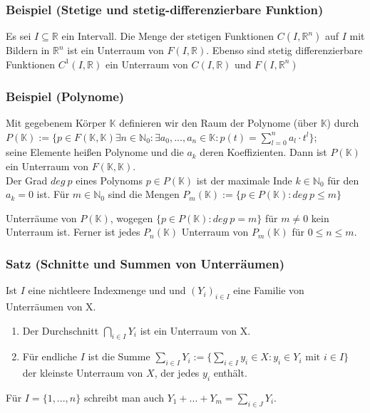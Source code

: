 \subsubsection{Beispiel (Stetige und stetig-differenzierbare Funktion)}
Es sei $I\subseteq \mathbb{R}$ ein Intervall. Die Menge der stetigen Funktionen $C(I,\mathbb{R}^n)$ auf $I$ mit Bildern in $\mathbb{R}^n$ ist ein Unterraum von $F(I,\mathbb{R})$. Ebenso sind stetig differenzierbare Funktionen $C^1(I,\mathbb{R})$ ein Unterraum von $C(I,\mathbb{R})$ und $F(I,\mathbb{R}^n)$
\subsubsection{Beispiel (Polynome)}
Mit gegebenem Körper $\mathbb{K}$ definieren wir den Raum der Polynome (über $\mathbb{K}$) durch \\$P(\mathbb{K}) := \{p\in F(\mathbb{K},\mathbb{K}) \exists n\in\mathbb{N}_0: \exists a_0, ..., a_n \in \mathbb{K} : p(t)=\sum^{n}_{l=0} a_l \cdot t^l\}$;\\
seine Elemente heißen Polynome und die $a_k$ deren Koeffizienten. Dann ist $P(\mathbb{K})$ ein Unterraum von $F(\mathbb{K},\mathbb{K})$.\\
Der Grad $deg\ p$ eines Polynoms $p\in P(\mathbb{K})$ ist der maximale Inde $k\in\mathbb{N}_0$ für den $a_k=0$ ist. Für $m\in\mathbb{N}_0$ sind die Mengen $P_m(\mathbb{K}) := \{p\in P(\mathbb{K}):deg\ p \le m\}$

Unterräume von $P(\mathbb{K})$, wogegen $\{p\in P(\mathbb{K}): deg\ p =m\}$ für $m\neq 0$ kein Unterraum ist. Ferner ist jedes $P_n(\mathbb{K})$ Unterraum von $P_m(\mathbb{K})$ für $0\le n\le m$.
\subsubsection{Satz (Schnitte und Summen von Unterräumen)}
Ist $I$ eine nichtleere Indexmenge und und $(Y_i)_{i\in I}$ eine Familie von Unterräumen von X.
\begin{enumerate}
\item Der Durchschnitt $\displaystyle\bigcap_{i\in I} Y_i$ ist ein Unterraum von X.
\item Für endliche $I$ ist die Summe $\displaystyle\sum_{i\in I}Y_i := \{\sum_{i\in I} y_i\in X: y_i\in Y_i \text{ mit } i\in I\}$ der kleinste Unterraum von $X$, der jedes $y_i$ enthält.
\end{enumerate}
Für $I=\{1,...,n\}$ schreibt man auch $\displaystyle Y_1+...+Y_m=\sum_{i\in J} Y_i$.

